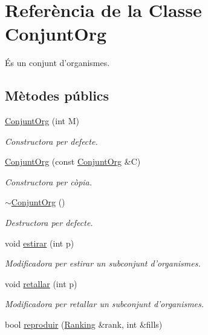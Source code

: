\hypertarget{class_conjunt_org}{\section{Referència de la Classe Conjunt\-Org}
\label{class_conjunt_org}
}


És un conjunt d'organismes.  


\subsection*{Mètodes públics}
\begin{DoxyCompactItemize}
\item 
\hyperlink{class_conjunt_org_a573205d24e669356dc44462a6ef95d71}{Conjunt\-Org} (int M)
\begin{DoxyCompactList}\small\item\em Constructora per defecte. \end{DoxyCompactList}\item 
\hyperlink{class_conjunt_org_a4a0c1fe0378f0564295dcaa5e7d9bde2}{Conjunt\-Org} (const \hyperlink{class_conjunt_org}{Conjunt\-Org} \&C)
\begin{DoxyCompactList}\small\item\em Constructora per còpia. \end{DoxyCompactList}\item 
\hyperlink{class_conjunt_org_a547e57b6f00347fa89695c33e9dd7743}{$\sim$\-Conjunt\-Org} ()
\begin{DoxyCompactList}\small\item\em Destructora per defecte. \end{DoxyCompactList}\item 
void \hyperlink{class_conjunt_org_aed52193459bacdfe3db143809beb5a0f}{estirar} (int p)
\begin{DoxyCompactList}\small\item\em Modificadora per estirar un subconjunt d'organismes. \end{DoxyCompactList}\item 
void \hyperlink{class_conjunt_org_a2ed57a61b109254526a28b6ec1944d2f}{retallar} (int p)
\begin{DoxyCompactList}\small\item\em Modificadora per retallar un subconjunt d'organismes. \end{DoxyCompactList}\item 
bool \hyperlink{class_conjunt_org_a5487cfb897f2a594d150f41774b53547}{reproduir} (\hyperlink{class_ranking}{Ranking} \&rank, int \&fills)

\end{DoxyCompactItemize}
